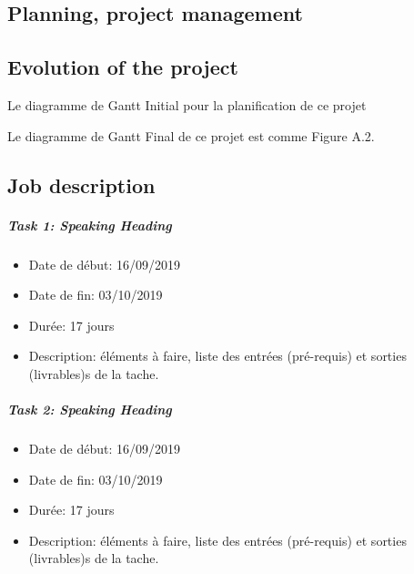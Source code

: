 \documentclass{polytech/polytech}
\numberwithin{figure}{chapter}
\begin{document}
\begin{appendix}

\chapter{Planning, project management}   

\section{Evolution of the project}

Le diagramme de Gantt Initial pour la planification de ce projet 


Le diagramme de Gantt Final de ce projet est comme Figure A.2.



\section{Job description}

\paragraph{Task 1: Speaking Heading}

\begin{itemize}
    \item Date de début: 16/09/2019
    \item Date de fin: 03/10/2019
    \item Durée: 17 jours
    \item
        Description: éléments à faire,
        liste des entrées (pré-requis)
        et sorties (livrables)s de la tache.
\end{itemize}

\paragraph{Task 2: Speaking Heading}

\begin{itemize}
    \item Date de début: 16/09/2019
    \item Date de fin: 03/10/2019
    \item Durée: 17 jours
    \item
        Description: éléments à faire,
        liste des entrées (pré-requis)
        et sorties (livrables)s de la tache.
\end{itemize}



\end{appendix}
\end{document}
